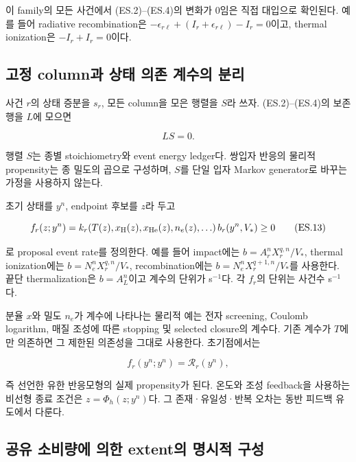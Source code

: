 이 family의 모든 사건에서 (ES.2)--(ES.4)의 변화가 0임은 직접 대입으로 확인된다. 예를 들어 radiative recombination은 \(-\epsilon_{r\ell}+(I_r+\epsilon_{r\ell})-I_r=0\)이고, thermal ionization은 \(-I_r+I_r=0\)이다.

\hypertarget{uxace0uxc815-columnuxacfc-uxc0c1uxd0dc-uxc758uxc874-uxacc4uxc218uxc758-uxbd84uxb9ac}{%
\subsection{고정 column과 상태 의존 계수의 분리}\label{uxace0uxc815-columnuxacfc-uxc0c1uxd0dc-uxc758uxc874-uxacc4uxc218uxc758-uxbd84uxb9ac}}

사건 \(r\)의 상태 증분을 \(s_r\), 모든 column을 모은 행렬을 \(S\)라 쓰자. (ES.2)--(ES.4)의 보존 행을 \(L\)에 모으면

\[
LS=0.
\tag{ES.12}
\]

행렬 \(S\)는 종별 stoichiometry와 event energy ledger다. 쌍입자 반응의 물리적 propensity는 종 밀도의 곱으로 구성하며, \(S\)를 단일 입자 Markov generator로 바꾸는 가정을 사용하지 않는다.

초기 상태를 \(y^n\), endpoint 후보를 \(z\)라 두고

\[
f_r(z;y^n)=k_r\!\left(T(z),x_{\rm H}(z),x_{\rm He}(z),
n_e(z),\ldots\right)b_r(y^n,V_*)
\ge0
\tag{ES.13}
\]

로 proposal event rate를 정의한다. 예를 들어 impact에는 \(b=A_r^nX_r^{q,n}/V_*\), thermal ionization에는 \(b=N_e^nX_r^{q,n}/V_*\), recombination에는 \(b=N_e^nX_r^{q+1,n}/V_*\)를 사용한다. 끝단 thermalization은 \(b=A_L^n\)이고 계수의 단위가 s\(^{-1}\)다. 각 \(f_r\)의 단위는 사건수 s\(^{-1}\)다.

분율 \(x\)와 밀도 \(n_e\)가 계수에 나타나는 물리적 예는 전자 screening, Coulomb logarithm, 매질 조성에 따른 stopping 및 selected closure의 계수다. 기존 계수가 \(T\)에만 의존하면 그 제한된 의존성을 그대로 사용한다. 초기점에서는

\[
f_r(y^n;y^n)=\mathcal R_r(y^n),
\]

즉 선언한 유한 반응모형의 실제 propensity가 된다. 온도와 조성 feedback을 사용하는 비선형 종료 조건은 \(z=\Phi_h(z;y^n)\)다. 그 존재·유일성·반복 오차는 동반 피드백 유도에서 다룬다.

\hypertarget{uxacf5uxc720-uxc18cuxbe44uxb7c9uxc5d0-uxc758uxd55c-extentuxc758-uxba85uxc2dcuxc801-uxad6cuxc131}{%
\subsection{공유 소비량에 의한 extent의 명시적 구성}\label{uxacf5uxc720-uxc18cuxbe44uxb7c9uxc5d0-uxc758uxd55c-extentuxc758-uxba85uxc2dcuxc801-uxad6cuxc131}}


